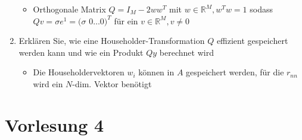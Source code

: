 \documentclass[]{article}
\begin{document}
\begin{enumerate}
\begin{itemize}
				\item Orthogonale Matrix $Q = I_M - 2w w^T$ mit $w \in \mathbb{R}^M, w^T w = 1$ sodass $Qv = \sigma e^1 = (\sigma$ $0 \dots 0)^T$ für ein $v \in \mathbb{R}^M, v \neq 0$
			\end{itemize}
		\item Erklären Sie, wie eine Householder-Transformation $Q$ effizient gespeichert werden kann und wie ein Produkt $Qy$ berechnet wird
			\begin{itemize}
				\item Die Householdervektoren $w_i$ können in $A$ gespeichert werden, für die $r_{nn}$ wird ein $N$-dim. Vektor benötigt
			\end{itemize}
	\end{enumerate}

\section{Vorlesung 4}
\end{document}
